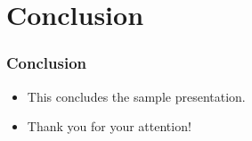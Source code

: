 \documentclass{beamer}
\begin{document}
    \section{Conclusion}
	\begin{frame}
		\frametitle{Conclusion}
		\begin{itemize}
			\item This concludes the sample presentation.

			\item Thank you for your attention!
		\end{itemize}
	\end{frame}
\end{document}
